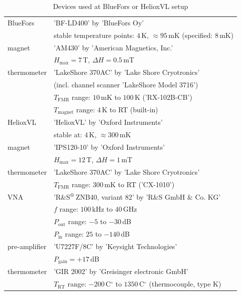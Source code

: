 \begin{table}
    \centering
    \caption{Devices used at BlueFors or HelioxVL setup}
    \vspace{4mm}
    \begin{tabular}{l|l}
     \hline BlueFors & 'BF-LD400' by 'BlueFors Oy' \cite{LD400manual}\\
         & stable temperature points: $4\,$K, $\approx 95\,$mK (specified: $8\,$mK)\\\hline
     magnet & 'AM430' by 'American Magnetics, Inc.' \cite{AM430manual}\\
     & $H_\text{max}=7\,$T, $\Delta H=0.5\,$mT\\\hline
     thermometer & 'LakeShore 370AC' by 'Lake Shore Cryotronics' \cite{LS370manual}\\
     & (incl. channel scanner 'LakeShore Model 3716')\\
     & $T_\text{FMR}$ range: $10\,$mK to $100\,$K ('RX-102B-CB') \cite{RX102bmanual}\\
     \vspace{5mm}& $T_\text{magnet}$ range: $4\,$K to RT (built-in)\\\hline
     
     HelioxVL & 'HelioxVL' by 'Oxford Instruments' \cite{HelioxVLmanual}\\
     & stable at: $4\,$K, $\approx 300\,$mK\\\hline
     magnet &  'IPS120-10' by 'Oxford Instruments' \cite{IPS12010manual}\\
     & $H_\text{max}=12\,$T, $\Delta H=1\,$mT\\\hline
     thermometer & 'LakeShore 370AC' by 'Lake Shore Cryotronics' \cite{LS370manual}\\
     \vspace{5mm}& $T_\text{FMR}$ range: $300\,$mK to RT ('CX-1010') \cite{CX1010manual}\\\hline
     
    VNA & 'R\&S$^\text{\textregistered}\,$ZNB40, variant 82'  by 'R\&S GmbH \& Co. KG' \cite{ZNB40manual, ZNB40spec, ZNB40brochure}\\
    & $f$ range: $100\,$kHz to $40\,$GHz\\
    & $P_\text{out}$ range: $-5$ to $-30\,$dB\\
    & $P_\text{in}$ range: $25$ to $-140\,$dB\\\hline
    pre-amplifier & 'U7227F/8C' by 'Keysight Technologies' \cite{U7227manual}\\
    & $P_\text{gain}=+17\,$dB\\\hline
    thermometer & 'GIR 2002' by 'Greisinger electronic GmbH' \cite{GIR2002manual, GMH3manual}\\
    & $T_\text{RT}$ range: $-200\,$C$^\circ$ to $1350\,$C$^\circ$ (thermocouple, type K)\\
    \end{tabular}
    \label{tab:setup_setup}
\end{table}

